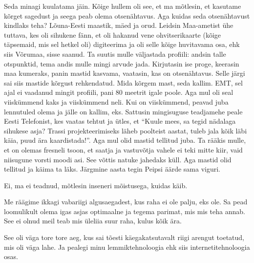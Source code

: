 
Seda minagi kuulatama jäin. Kõige hullem oli see, et ma mõtlesin, et kasutame 
kõrget sagedust ja seega peab olema otsenähtavus. Aga kuidas seda otsenähtavust 
kindlaks teha?  Lõuna-Eesti maastik, mäed ja orud. Leidsin 
Maa-ametist ühe tuttava, kes oli sihukene fänn, et oli hakanud 
vene ohvitserikaarte (kõige täpsemaid, mis sel hetkel oli) digiteerima ja oli 
selle kõige huvitavama osa, ehk siis Võrumaa,  sisse saanud. Ta suutis mulle 
väljastada  profiili: andsin talle otspunktid, tema andis mulle mingi arvude 
jada. Kirjutasin ise proge, keerasin maa kumeraks, panin mastid kasvama, 
vaatasin, kas on otsenähtavus. Selle järgi sai siis  mastide kõrgust 
rehkendatud. Mida kõrgem mast, seda kallim. EMT, sel ajal ei 
vaadanud mingit profiili, pani 80 meetrit igale poole. Aga mul oli seal 
viiskümmend kaks ja viiskümmend neli. Kui on viiskümmend, peavad juba 
lennutuled olema ja jälle on kallim, eks. Sattusin mingisuguse teadjamehe peale 
Eesti Telefonist, kes vaatas tehtut ja ütles, et 
\enquote{Kuule mees, sa tegid nädalaga sihukese asja? Trassi projekteerimiseks 
läheb poolteist aastat, tuleb jala kõik läbi käia, puud ära kaardistada!}. Aga 
mul olid mastid tellitud juba. Ta rääkis mulle, et on olemas fresneli tsoon, et 
saatja ja vastuvõtja vahele ei teki mitte kiir, vaid niisugune vorsti moodi 
asi. See võttis natuke jahedaks 
küll. Aga mastid olid tellitud ja käima ta läks. Järgmine aasta tegin Peipsi 
äärde sama viguri. 


Ei, ma ei teadnud,  mõtlesin inseneri mõistusega, kuidas käib. 


Me räägime ikkagi vabariigi algusaegadest, kus raha ei ole palju, eks ole. Sa 
pead loomulikult olema igas asjas optimaalne ja tegema parimat, mis mis teha 
annab. See ei olnud meil teab mis üleliia suur raha, kulus kõik ära. 

See oli väga tore tore aeg, kus sai tõesti käegakatsutavalt riigi arengut 
toetatud, mis oli väga lahe. Ja pealegi minu lemmiktehnoloogia ehk siis 
internetitehnoloogia osas. 

